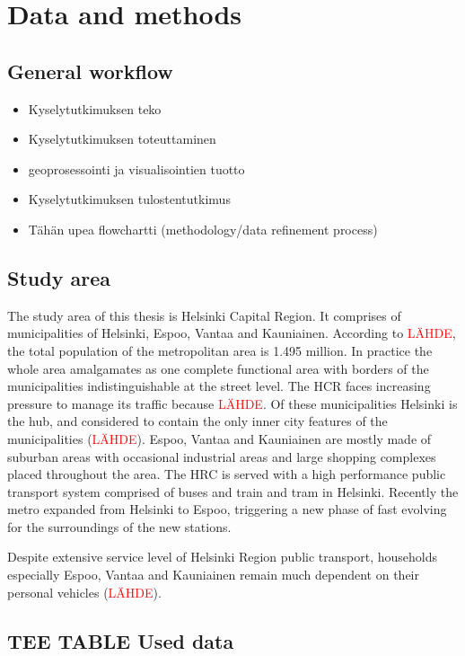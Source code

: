 \section{Data and methods}
\subsection{General workflow}
\justify
\begin{itemize}
    \item Kyselytutkimuksen teko
    \item Kyselytutkimuksen toteuttaminen
    \item geoprosessointi ja visualisointien tuotto
    \item Kyselytutkimuksen tulostentutkimus
    \item Tähän upea flowchartti (methodology/data refinement process)
\end{itemize}

\subsection{Study area}
\justify
The study area of this thesis is Helsinki Capital Region. It comprises of municipalities of Helsinki, Espoo, Vantaa and Kauniainen. According to \textcolor{red}{LÄHDE}, the total population of the metropolitan area is 1.495 million. In practice the whole area amalgamates as one complete functional area with borders of the municipalities indistinguishable at the street level. The HCR faces increasing pressure to manage its traffic because \textcolor{red}{LÄHDE}. Of these municipalities Helsinki is the hub, and considered to contain the only inner city features of the municipalities (\textcolor{red}{LÄHDE}). Espoo, Vantaa and Kauniainen are mostly made of suburban areas with occasional industrial areas and large shopping complexes placed throughout the area. The HRC is served with a high performance public transport system comprised of buses and train and tram in Helsinki. Recently the metro expanded from Helsinki to Espoo, triggering a new phase of fast evolving for the surroundings of the new stations.

Despite extensive service level of Helsinki Region public transport, households especially Espoo, Vantaa and Kauniainen remain much dependent on their personal vehicles (\textcolor{red}{LÄHDE}). 

\subsection{TEE TABLE Used data}
\justify

